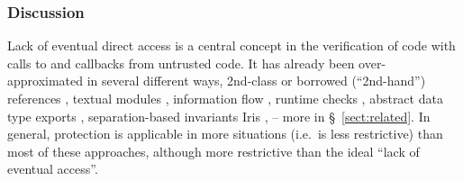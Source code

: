  
 
 \subsubsection*{Discussion} 
Lack of  eventual 
direct access is a central concept in the verification of code with calls to and callbacks  from untrusted code.
It has already been over-approximated in several different ways, \eg
2nd-class \cite{rompf-second-class-oopsla2016,rompf-dont-pop-second-class-ecoop2022}
or borrowed (``2nd-hand'') references
\cite{boyland-promises-icse1998,boyland-aliasburying-spe2001},
 textual modules \cite{OOPSLA22},
information flow \cite{ddd}, runtime
checks \cite{secure-io-fstar-popl2024},
abstract data type exports \cite{vmsl-pldi2023},
  separation-based invariants 
Iris \cite{iris-wasm-pldi2023,cerise-jacm2024},
-- more in  \S~\ref{sect:related}.
In general, protection is applicable in more situations (i.e.\ is less
restrictive) than most of these approaches,
 although more restrictive than the ideal ``lack of eventual access''. 





